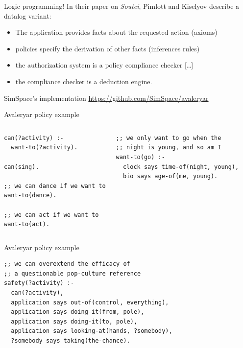 \documentclass[aspectratio=169,ignorenonframetext]{beamer}
\begin{document}
\begin{frame}{Logic programming!}
	In their paper on \emph{Soutei}, Pimlott and Kiselyov describe a datalog variant:
	\begin{itemize}
		\item The application provides facts about the requested action (axioms)
		\item policies specify the derivation of other facts (inferences rules)
		\item the authorization system is a policy compliance checker [\ldots]
		\item the compliance checker is a deduction engine.
	\end{itemize}

	\begin{block}{SimSpace's implementation}
		\url{https://github.com/SimSpace/avaleryar}
	\end{block}
\end{frame}

\begin{frame}[fragile]{Avaleryar policy example}
	\begin{columns}
		\begin{block}{}
			\begin{verbatim}
can(?activity) :-
  want-to(?activity).

can(sing).

;; we can dance if we want to
want-to(dance).

;; we can act if we want to
want-to(act).
		    \end{verbatim}
		\end{block}
		\begin{block}{}
			\begin{verbatim}
;; we only want to go when the
;; night is young, and so am I
want-to(go) :-
  clock says time-of(night, young),
  bio says age-of(me, young).
		    \end{verbatim}
		\end{block}
	\end{columns}
\end{frame}

\begin{frame}[fragile]{Avaleryar policy example}
	\begin{block}{}
		\begin{verbatim}
;; we can overextend the efficacy of
;; a questionable pop-culture reference
safety(?activity) :-
  can(?activity),
  application says out-of(control, everything),
  application says doing-it(from, pole),
  application says doing-it(to, pole),
  application says looking-at(hands, ?somebody),
  ?somebody says taking(the-chance).
		\end{verbatim}
	\end{block}
\end{frame}
\end{document}
